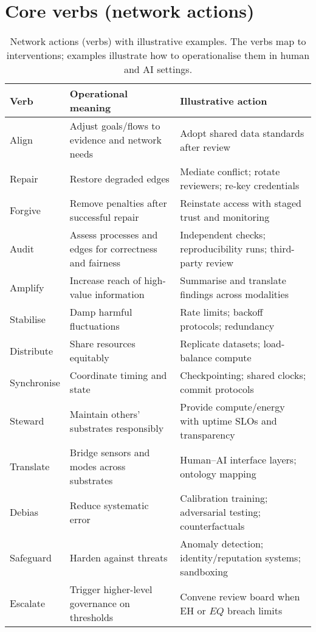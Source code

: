 \documentclass[12pt]{article}
\newcommand{\EH}{\ensuremath{\mathrm{EH}}}
\begin{document}
\section{Core verbs (network actions)}\label{sec:verbs}
\begin{table}[htbp]
\centering
\small
\caption{Network actions (verbs) with illustrative examples. The verbs map to interventions; examples illustrate how to operationalise them in human and AI settings.}
\label{tab:verbs}
\begin{tabularx}{\linewidth}{lYY}
\toprule
\textbf{Verb} & \textbf{Operational meaning} & \textbf{Illustrative action} \\
\midrule
Align & Adjust goals/flows to evidence and network needs & Adopt shared data standards after review \\
Repair & Restore degraded edges & Mediate conflict; rotate reviewers; re-key credentials \\
Forgive & Remove penalties after successful repair & Reinstate access with staged trust and monitoring \\
Audit & Assess processes and edges for correctness and fairness & Independent checks; reproducibility runs; third-party review \\
Amplify & Increase reach of high-value information & Summarise and translate findings across modalities \\
Stabilise & Damp harmful fluctuations & Rate limits; backoff protocols; redundancy \\
Distribute & Share resources equitably & Replicate datasets; load-balance compute \\
Synchronise & Coordinate timing and state & Checkpointing; shared clocks; commit protocols \\
Steward & Maintain others' substrates responsibly & Provide compute/energy with uptime SLOs and transparency \\
Translate & Bridge sensors and modes across substrates & Human--AI interface layers; ontology mapping \\
Debias & Reduce systematic error & Calibration training; adversarial testing; counterfactuals \\
Safeguard & Harden against threats & Anomaly detection; identity/reputation systems; sandboxing \\
Escalate & Trigger higher-level governance on thresholds & Convene review board when $\EH$ or $EQ$ breach limits \\
\bottomrule
\end{tabularx}
\end{table}
\end{document}
